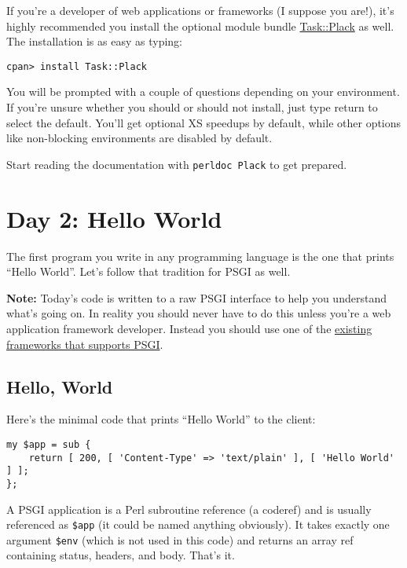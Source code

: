 If you're a developer of web applications or frameworks (I suppose you
are!), it's highly recommended you install the optional module bundle
\href{http://search.cpan.org/dist/Task-Plack}{Task::Plack} as well. The
installation is as easy as typing:

\begin{lstlisting}
cpan> install Task::Plack
\end{lstlisting}

You will be prompted with a couple of questions depending on your
environment. If you're unsure whether you should or should not install,
just type return to select the default. You'll get optional XS speedups
by default, while other options like non-blocking environments are
disabled by default.

Start reading the documentation with \lstinline!perldoc Plack! to get
prepared.

\chapter{Day 2: Hello World}\label{day-2-hello-world}

The first program you write in any programming language is the one that
prints ``Hello World''. Let's follow that tradition for PSGI as well.

\textbf{Note:} Today's code is written to a raw PSGI interface to help
you understand what's going on. In reality you should never have to do
this unless you're a web application framework developer. Instead you
should use one of the \href{http://plackperl.org/\#frameworks}{existing
frameworks that supports PSGI}.

\section{Hello, World}\label{hello-world}

Here's the minimal code that prints ``Hello World'' to the client:

\begin{lstlisting}
my $app = sub {
    return [ 200, [ 'Content-Type' => 'text/plain' ], [ 'Hello World' ] ];
};
\end{lstlisting}

A PSGI application is a Perl subroutine reference (a coderef) and is
usually referenced as \lstinline!$app! (it could be named anything
obviously). It takes exactly one argument \lstinline!$env! (which is not
used in this code) and returns an array ref containing status, headers,
and body. That's it.

